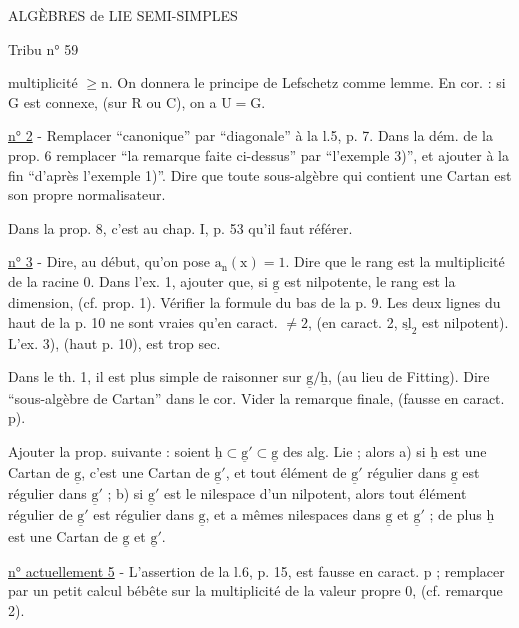 ALGÈBRES de LIE SEMI-SIMPLES 

Tribu n° 59

multiplicité $\geqslant\mathrm{n}$. On donnera le principe de Lefschetz comme lemme. En cor. : si $\mathrm{G}$ est connexe, (sur $\mathrm{R}$ ou $\mathrm{C}$), on a $\mathrm{U}=\mathrm{G}$.

\uline{n° 2} - Remplacer ``canonique'' par ``diagonale'' à la l.5, p. 7. Dans la dém. de la prop. 6 remplacer ``la remarque faite ci-dessus'' par ``l'exemple 3)'', et ajouter à la fin ``d'après l'exemple 1)''. Dire que toute sous-algèbre qui contient une Cartan est son propre normalisateur.

Dans la prop. 8, c'est au chap. I, p. 53 qu'il faut référer.

\uline{n° 3} - Dire, au début, qu'on pose $\mathrm{a}_{\mathrm{n}}(\mathrm{x})=1$. Dire que le rang est la multiplicité de la racine $0$. Dans l'ex. 1, ajouter que, si $\underline{\mathrm{g}}$ est nilpotente, le rang est la dimension, (cf. prop. 1). Vérifier la formule du bas de la p. 9. Les deux lignes du haut de la p. 10 ne sont vraies qu'en caract. $\neq 2$, (en caract. 2, $\underline{\mathrm{sl}}_2$ est nilpotent). L'ex. 3), (haut p. 10), est trop sec.

Dans le th. 1, il est plus simple de raisonner sur $\underline{\mathrm{g}}/\underline{\mathrm{h}}$, (au lieu de Fitting). Dire ``sous-algèbre de Cartan'' dans le cor. Vider la remarque finale, (fausse en caract. $\mathrm{p}$).

Ajouter la prop. suivante : soient $\underline{\mathrm{h}}\subset\underline{\mathrm{g}}'\subset\underline{\mathrm{g}}$ des alg. Lie ; alors a) si $\underline{\mathrm{h}}$ est une Cartan de $\underline{\mathrm{g}}$, c'est une Cartan de $\underline{\mathrm{g}}'$, et tout élément de $\underline{\mathrm{g}}'$ régulier dans $\underline{\mathrm{g}}$ est régulier dans $\underline{\mathrm{g}}'$ ; b) si $\underline{\mathrm{g}}'$ est le nilespace d'un nilpotent, alors tout élément régulier de $\underline{\mathrm{g}}'$ est régulier dans $\underline{\mathrm{g}}$, et a mêmes nilespaces dans $\underline{\mathrm{g}}$ et $\underline{\mathrm{g}}'$ ; de plus $\underline{\mathrm{h}}$ est une Cartan de $\underline{\mathrm{g}}$ et $\underline{\mathrm{g}}'$.

\uline{n° actuellement 5} - L'assertion de la l.6, p. 15, est fausse en caract. $\mathrm{p}$ ; remplacer par un petit calcul bébête sur la multiplicité de la valeur propre $0$, (cf. remarque 2).

